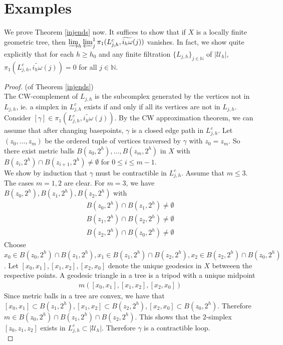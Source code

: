 \documentclass[a4paper,11pt]{article}
\theoremstyle{definition}
\theoremstyle{plain}
\theoremstyle{remark}
\begin{document}
{\newpage
\section{Examples}

We prove Theorem \ref{injends} now. It suffices to show that if $X$ is a locally finite geometric tree, then $ \varinjlim_{h} \varprojlim^1_{j} \pi_{1}(L_{j,h}^c,\widetilde{i_{h}\omega}(j))$ vanishes. In fact, we show quite explicitly that for each $h\geq h_0$ and any finite filtration $\{L_{j,h}\}_{j\in \mathbb{N}}$ of $|\mathcal{U}_{h}|$,  $\pi_{1}(L_{j,h}^c,\widetilde{i_{h}\omega}(j)) = 0$ for all $j\in \mathbb{N}$.\\

\begin{proof} (of Theorem \ref{injends})\\

The CW-complement of $L_{j,h}$ is the subcomplex generated by the vertices not in $L_{j,h}$, ie. a simplex in $L^{c}_{j,h}$ exists if and only if all its vertices are not in $L_{j,h}$. Consider $[\gamma]\in \pi_{1}(L_{j,h}^c,\widetilde{i_{h}\omega}(j))$. By the CW approximation theorem, we can assume that after changing basepoints, $\gamma$ is a closed edge path in $L_{j,h}^c$. Let $(z_0,\dots,z_m)$ be the ordered tuple of vertices traversed by $\gamma$ with $z_0=z_m$. So there exist metric balls $B(z_0,2^h),\dots, B(z_m, 2^h)$ in $X$ with $B(z_i, 2^h)\cap B(z_{i+1},2^h) \neq \emptyset$ for $0\leq i\leq m-1$. \\

We show by induction that $\gamma$ must be contractible in $L_{j,h}^c$. Assume that $m\leq 3$. The cases $m=1,2$ are clear. For $m=3$, we have $B(z_0,2^{h}), B(z_1,2^{h}),B(z_2,2^{h})$ with 
\begin{align*}
B(z_0,2^{h})\cap B(z_1,2^{h}) \neq \emptyset\\
B(z_1,2^{h})\cap B(z_2,2^{h}) \neq \emptyset\\
B(z_2,2^{h})\cap B(z_0,2^{h}) \neq \emptyset
\end{align*}
Choose $x_0 \in B(z_0,2^{h})\cap B(z_1,2^{h}), x_1 \in B(z_1,2^{h})\cap B(z_2,2^{h}), x_2 \in B(z_2,2^{h})\cap B(z_0,2^{h})$. Let $[x_0,x_1],[x_1,x_2],[x_2,x_0]$ denote the unique geodesics in $X$ betweeen the respective points. A geodesic triangle in a tree is a tripod with a unique midpoint 
\begin{align*}
m([x_0,x_1],[x_1,x_2],[x_2,x_0])
\end{align*}    
Since metric balls in a tree are convex, we have that $[x_0,x_1]\subset B(z_1,2^h), [x_1,x_2] \subset B(z_2,2^h), [x_2,x_0]\subset B(z_0,2^h)$. Therefore $m\in B(z_0,2^{h})\cap B(z_1,2^{h})\cap B(z_2,2^{h})$. This shows that the $2$-simplex $[z_0,z_1,z_2]$ exists in $L^c_{j,h}\subset |\mathcal{U}_{h}|$. Therefore $\gamma$ is a contractible loop. \\


\end{proof}}
\end{document}
